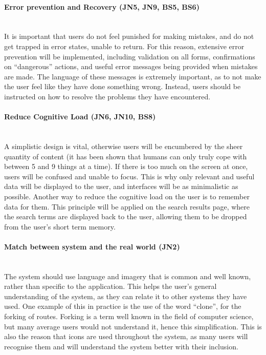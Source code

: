 \paragraph{Error prevention and Recovery (JN5, JN9, BS5, BS6)}\ \\
It is important that users do not feel punished for making mistakes, and do not get trapped in error states, unable to return. For this reason, extensive error prevention will be implemented, including validation on all forms, confirmations on ``dangerous'' actions, and useful error messages being provided when mistakes are made. The language of these messages is extremely important, as to not make the user feel like they have done something wrong. Instead, users should be instructed on how to resolve the problems they have encountered.

\paragraph{Reduce Cognitive Load (JN6, JN10, BS8)}\ \\
A simplistic design is vital, otherwise users will be encumbered by the sheer quantity of content (it has been shown that humans can only truly cope with between 5 and 9 things at a time\cite{miller1956magical}). If there is too much on the screen at once, users will be confused and unable to focus. This is why only relevant and useful data will be displayed to the user, and interfaces will be as minimalistic as possible. Another way to reduce the cognitive load on the user is to remember data for them. This principle will be applied on the search results page, where the search terms are displayed back to the user, allowing them to be dropped from the user's short term memory. 

\paragraph{Match between system and the real world (JN2)}\ \\
The system should use language and imagery that is common and well known, rather than specific to the application. This helps the user's general understanding of the system, as they can relate it to other systems they have used. One example of this in practice is the use of the word ``clone'', for the forking of routes. Forking is a term well known in the field of computer science, but many average users would not understand it, hence this simplification. This is also the reason that icons are used throughout the system, as many users will recognise them and will understand the system better with their inclusion.

